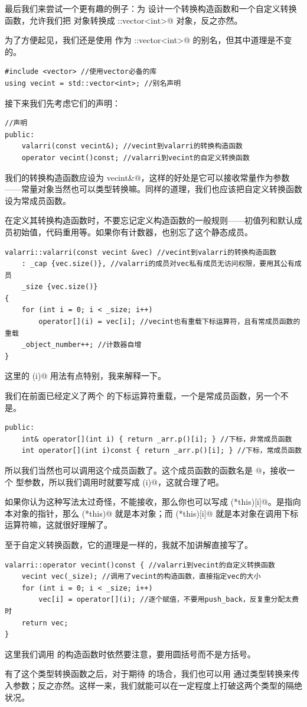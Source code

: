 最后我们来尝试一个更有趣的例子：为 \lstinline@valarri@ 设计一个转换构造函数和一个自定义转换函数，允许我们把 \lstinline@valarri@ 对象转换成 \lstinline@std::vector<int>@ 对象，反之亦然。\par
为了方便起见，我们还是使用 \lstinline@vecint@ 作为 \lstinline@std::vector<int>@ 的别名，但其中道理是不变的。
\begin{lstlisting}
#include <vector> //使用vector必备的库
using vecint = std::vector<int>; //别名声明
\end{lstlisting}
接下来我们先考虑它们的声明：
\begin{lstlisting}
//声明
public:
    valarri(const vecint&); //vecint到valarri的转换构造函数
    operator vecint()const; //valarri到vecint的自定义转换函数
\end{lstlisting}
我们的转换构造函数应设为 \lstinline@const vecint&@，这样的好处是它可以接收常量作为参数——常量对象当然也可以类型转换嘛。同样的道理，我们也应该把自定义转换函数设为常成员函数。\par
在定义其转换构造函数时，不要忘记定义构造函数的一般规则——初值列和默认成员初始值，代码重用等。如果你有计数器，也别忘了这个静态成员。
\begin{lstlisting}
valarri::valarri(const vecint &vec) //vecint到valarri的转换构造函数
    : _cap {vec.size()}, //valarri的成员对vec私有成员无访问权限，要用其公有成员
    _size {vec.size()}
{
    for (int i = 0; i < _size; i++)
        operator[](i) = vec[i]; //vecint也有重载下标运算符，且有常成员函数的重载
    _object_number++; //计数器自增
}
\end{lstlisting}
这里的 \lstinline@operator[](i)@ 用法有点特别，我来解释一下。\par
我们在前面已经定义了两个 \lstinline@valarri@ 的下标运算符重载，一个是常成员函数，另一个不是。
\begin{lstlisting}
public:
    int& operator[](int i) { return _arr.p()[i]; } //下标，非常成员函数
    int operator[](int i)const { return _arr.p()[i]; } //下标，常成员函数
\end{lstlisting}
所以我们当然也可以调用这个成员函数了。这个成员函数的函数名是 \lstinline@operator[]@，接收一个 \lstinline@int@ 型参数，所以我们调用时就要写成 \lstinline@operator[](i)@，这就合理了吧。\par
如果你认为这种写法太过奇怪，不能接收，那么你也可以写成 \lstinline@(*this)[i]@。\lstinline@this@ 是指向本对象的指针，那么 \lstinline@(*this)@ 就是本对象；而 \lstinline@(*this)[i]@ 就是本对象在调用下标运算符嘛，这就很好理解了。\par
至于自定义转换函数，它的道理是一样的，我就不加讲解直接写了。
\begin{lstlisting}
valarri::operator vecint()const { //valarri到vecint的自定义转换函数
    vecint vec(_size); //调用了vecint的构造函数，直接指定vec的大小
    for (int i = 0; i < _size; i++)
        vec[i] = operator[](i); //逐个赋值，不要用push_back，反复重分配太费时
    return vec;
}
\end{lstlisting}
这里我们调用 \lstinline@vecint@ 的构造函数时依然要注意，要用圆括号而不是方括号。\par
有了这个类型转换函数之后，对于期待 \lstinline@vecint@ 的场合，我们也可以用 \lstinline@valarri@ 通过类型转换来传入参数；反之亦然。这样一来，我们就能可以在一定程度上打破这两个类型的隔绝状况。\par
